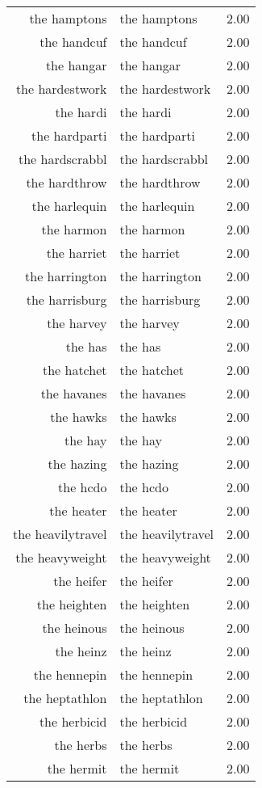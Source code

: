 \begin{table}[ht]
\begin{tabular}{rlr}
  the hamptons & the hamptons & 2.00 \\ 
  the handcuf & the handcuf & 2.00 \\ 
  the hangar & the hangar & 2.00 \\ 
  the hardestwork & the hardestwork & 2.00 \\ 
  the hardi & the hardi & 2.00 \\ 
  the hardparti & the hardparti & 2.00 \\ 
  the hardscrabbl & the hardscrabbl & 2.00 \\ 
  the hardthrow & the hardthrow & 2.00 \\ 
  the harlequin & the harlequin & 2.00 \\ 
  the harmon & the harmon & 2.00 \\ 
  the harriet & the harriet & 2.00 \\ 
  the harrington & the harrington & 2.00 \\ 
  the harrisburg & the harrisburg & 2.00 \\ 
  the harvey & the harvey & 2.00 \\ 
  the has & the has & 2.00 \\ 
  the hatchet & the hatchet & 2.00 \\ 
  the havanes & the havanes & 2.00 \\ 
  the hawks & the hawks & 2.00 \\ 
  the hay & the hay & 2.00 \\ 
  the hazing & the hazing & 2.00 \\ 
  the hcdo & the hcdo & 2.00 \\ 
  the heater & the heater & 2.00 \\ 
  the heavilytravel & the heavilytravel & 2.00 \\ 
  the heavyweight & the heavyweight & 2.00 \\ 
  the heifer & the heifer & 2.00 \\ 
  the heighten & the heighten & 2.00 \\ 
  the heinous & the heinous & 2.00 \\ 
  the heinz & the heinz & 2.00 \\ 
  the hennepin & the hennepin & 2.00 \\ 
  the heptathlon & the heptathlon & 2.00 \\ 
  the herbicid & the herbicid & 2.00 \\ 
  the herbs & the herbs & 2.00 \\ 
  the hermit & the hermit & 2.00 \\ 

\end{tabular}
\end{table}
